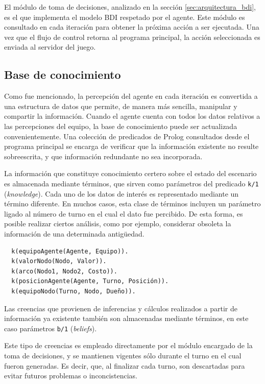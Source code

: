 El módulo de toma de decisiones, analizado en la sección
\ref{sec:arquitectura_bdi}, es el que implementa el modelo BDI
respetado por el agente.
Este módulo es consultado en cada iteración para obtener la próxima
acción a ser ejecutada.
Una vez que el flujo de control retorna al programa principal, la
acción seleccionada es enviada al servidor del juego.

\subsection{Base de conocimiento}
\label{sec:base_de_conocimiento}

Como fue mencionado, la percepción del agente en cada iteración es
convertida a una estructura de datos que permite, de manera más
sencilla, manipular y compartir la información.
Cuando el agente cuenta con todos los datos relativos a las
percepciones del equipo, la base de conocimiento puede ser
actualizada convenientemente.
Una colección de predicados de Prolog consultados desde el programa
principal se encarga de verificar que la información existente no
resulte sobreescrita, y que información redundante no sea incorporada.

La información que constituye conocimiento certero sobre el estado del
escenario es almacenada mediante términos, que sirven como parámetros
del predicado \texttt{k/1} (\textit{knowledge}).
Cada uno de los datos de interés es representado mediante un término
diferente.
En muchos casos, esta clase de términos incluyen un parámetro ligado
al número de turno en el cual el dato fue percibido.
De esta forma, es posible realizar ciertos análisis, como por
ejemplo, considerar obsoleta la información de una determinada
antigüedad.

\begin{verbatim}  
  k(equipoAgente(Agente, Equipo)).
  k(valorNodo(Nodo, Valor)).
  k(arco(Nodo1, Nodo2, Costo)).
  k(posicionAgente(Agente, Turno, Posición)).
  k(equipoNodo(Turno, Nodo, Dueño)). 
\end{verbatim}

Las creencias que provienen de inferencias y cálculos realizados a
partir de información ya existente también son almacenadas mediante
términos, en este caso parámetros %
\texttt{b/1} (\textit{beliefs}). 

Este tipo de creencias es empleado directamente por el módulo
encargado de la toma de decisiones, y se mantienen vigentes sólo
durante el turno en el cual fueron generadas. Es decir, que, al
finalizar cada turno, son descartadas para evitar futuros problemas o
inconcistencias.

